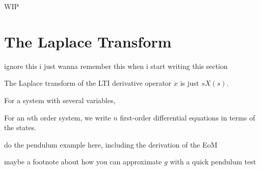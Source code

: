 \documentclass{report}
\begin{document}
\begin{onehalfspacing}
\begin{flushleft}
WIP

\section{The Laplace Transform}

ignore this i just wanna remember this when i start writing this section

The Laplace transform of the LTI derivative operator \(\dot{x}\) is just \(sX(s)\).



For a system with several variables, 

For an \(n\)th order system, we write \(n\) first-order differential equations in terms of the states.

do the pendulum example here, including the derivation of the EoM

maybe a footnote about how you can approximate \(g\) with a quick pendulum test

\end{flushleft}
\end{onehalfspacing}
\end{document}
